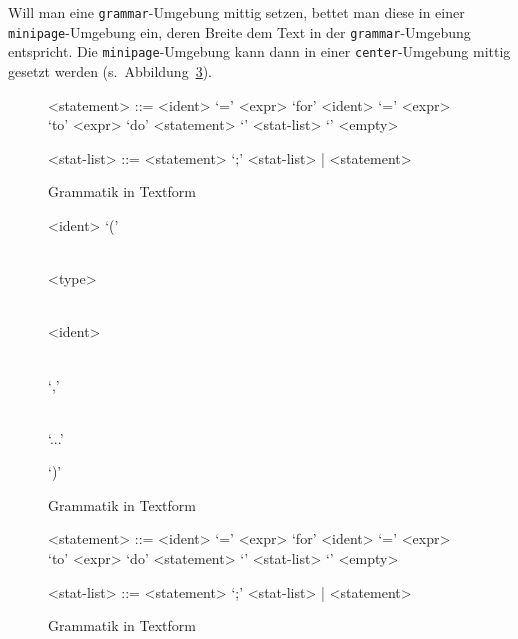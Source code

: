 Will man eine \lstinline!grammar!-Umgebung mittig setzen, bettet man diese in
einer \lstinline!minipage!-Umgebung ein, deren Breite dem Text in der
\lstinline!grammar!-Umgebung entspricht. Die \lstinline!minipage!-Umgebung
kann dann in einer \lstinline!center!-Umgebung mittig gesetzt werden (s.\
Abbildung~\ref{fig:syntaxtextcentered}).


\begin{figure}[htbp]
  \centering
\setlength{\grammarindent}{3cm}
\setlength{\grammarparsep}{8pt}
\begin{grammar}
<statement> ::= <ident> `=' <expr>
  \alt `for' <ident> `=' <expr> `to' <expr> `do' <statement>
  \alt `{' <stat-list> `}'
  \alt <empty>

<stat-list> ::= <statement> `;' <stat-list> | <statement>
\end{grammar}
  \caption{Grammatik in Textform}
  \label{fig:syntaxtext}
\end{figure}


\begin{figure}[htbp]
  \centering
\begin{syntdiag}
<ident> `('
 \begin{rep} \begin{stack} \\
   <type> \begin{stack} \\ <ident> \end{stack}
 \end{stack} \\ `,' \end{rep}
\begin{stack} \\ `...' \end{stack} `)'
\end{syntdiag}
  \caption{Grammatik in Textform}
  \label{fig:syntaxgraph}
\end{figure}


\begin{figure}[htbp]
  \begin{center}
    \begin{minipage}{.8\textwidth}
      \setlength{\grammarindent}{3cm}
      \setlength{\grammarparsep}{8pt}
      \begin{grammar}
        <statement> ::= <ident> `=' <expr>
        \alt `for' <ident> `=' <expr> `to' <expr> `do' <statement>
        \alt `{' <stat-list> `}'
        \alt <empty>
        
        <stat-list> ::= <statement> `;' <stat-list> | <statement>
      \end{grammar}
    \end{minipage}
  \end{center}
  \caption{Grammatik in Textform}
  \label{fig:syntaxtextcentered}
\end{figure}




